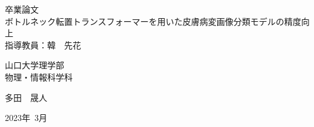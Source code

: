 {

\begin{titlepage}
 \begin{center}
\vspace{60mm}
 {\Large 卒業論文\\}
 \vspace{10mm}
 {\Huge ボトルネック転置トランスフォーマーを用いた皮膚病変画像分類モデルの精度向上\\} \vspace{60mm}
  {\LARGE 指導教員：韓　先花}
  \vspace{15mm}

  \setlength{\baselineskip}{24pt}
  {\LARGE 山口大学理学部\\物理・情報科学科}
  \vspace{5mm}

  {\LARGE 多田　晟人}
  \vspace{15mm}

  {\LARGE 2023年~3月}
 \end{center}
\end{titlepage}
}
